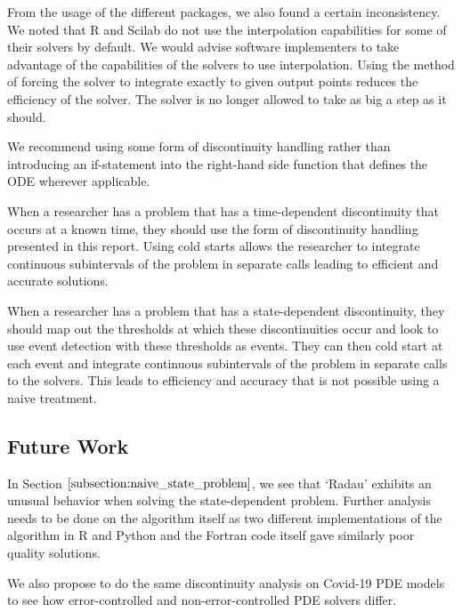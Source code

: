 From the usage of the different packages, we also found a certain inconsistency. We noted that R and Scilab do not use the interpolation capabilities for some of their solvers by default. We would advise software implementers to take advantage of the capabilities of the solvers to use interpolation. Using the method of forcing the solver to integrate exactly to given output points reduces the efficiency of the solver. The solver is no longer allowed to take as big a step as it should.

We recommend using some form of discontinuity handling rather than introducing an if-statement into the right-hand side function that defines the ODE wherever applicable.

When a researcher has a problem that has a time-dependent discontinuity that occurs at a known time, they should use the form of discontinuity handling presented in this report. Using cold starts allows the researcher to integrate continuous subintervals of the problem in separate calls leading to efficient and accurate solutions.

When a researcher has a problem that has a state-dependent discontinuity, they should map out the thresholds at which these discontinuities occur and look to use event detection with these thresholds as events. They can then cold start at each event and integrate continuous subintervals of the problem in separate calls to the solvers. This leads to efficiency and accuracy that is not possible using a naive treatment. 

\subsection{Future Work}
\label{subsection:future_work}
In Section $\ref{subsection:naive_state_problem}$, we see that `Radau' exhibits an unusual behavior when solving the state-dependent problem. Further analysis needs to be done on the algorithm itself as two different implementations of the algorithm in R and Python and the Fortran code itself gave similarly poor quality solutions.

We also propose to do the same discontinuity analysis on Covid-19 PDE models to see how error-controlled and non-error-controlled PDE solvers differ.


